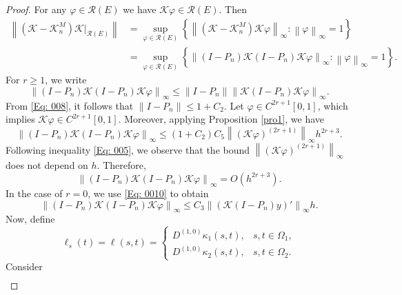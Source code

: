 \documentclass[10pt,a4paper]{amsart}
\newcommand{\norm}[1]{\left\lVert #1\right\rVert}
\begin{document}
\begin{proof}
	For any \(\varphi \in \mathcal{R}(E)\) we have  \( \mathcal{K}\varphi \in \mathcal{R}(E)\). Then 
	\begin{align*}
		\norm{(\mathcal{K} - \mathcal{K}_n^M) \mathcal{K} |_{\mathcal{R}(E)}} &= \sup_{\varphi \in \mathcal{R}(E)}\left\{ 	\norm{(\mathcal{K} - \mathcal{K}_n^M) \mathcal{K}\varphi}_\infty : \norm{\varphi}_\infty =1 \right\} \\
		&= \sup_{\varphi \in \mathcal{R}(E)}\left\{ \norm{(I - P_n) \mathcal{K}(I - P_n)\mathcal{K}\varphi}_\infty : \norm{\varphi}_\infty =1 \right\}.
	\end{align*}
	For \( r \geq 1 \), we write  
	\begin{equation*}
		\norm{(I - P_n) \mathcal{K}(I - P_n)\mathcal{K}\varphi}_\infty \leq\norm{I - P_n} \norm{\mathcal{K}(I - P_n)\mathcal{K}\varphi}_\infty.
	\end{equation*}
	From \eqref{Eq: 008}, it follows that \( \norm{I - P_n} \leq 1 +C_2 \). Let \( \varphi \in C^{2r+1}[0,1] \), which implies \( \mathcal{K} \varphi \in C^{2r+1}[0,1] \). Moreover, applying Proposition \ref{pro1}, we have
	\begin{equation*}
		\norm{(I - P_n) \mathcal{K}(I - P_n)\mathcal{K}\varphi}_\infty \leq (1 +C_2)C_5 \norm{(\mathcal{K}\varphi)^{(2r+1)}}_\infty h^{2r+3}.
	\end{equation*}
	Following inequality \eqref{Eq: 005}, we observe that the bound \(\norm{ \left(\mathcal{K}\varphi\right)^{(2r+1)}}_\infty \) does not depend on \(h\). Therefore, 
	\begin{equation} \label{Eq: 0030}
		\norm{(I - P_n) \mathcal{K}(I - P_n)\mathcal{K}\varphi}_\infty = O\left(h^{2r+3}\right).
	\end{equation}
	In the case of \(r=0\), we use \eqref{Eq: 0010} to obtain
	\begin{equation} \label{Eq: 0031}
		\norm{(I - P_n) \mathcal{K}(I - P_n)\mathcal{K}\varphi}_\infty \leq C_3 \norm{\left( \mathcal{K}(I - P_n)y\right)'}_\infty h.
	\end{equation}
	Now, define 
	\begin{equation*}
		\ell_s(t) = \ell(s,t) = \begin{cases}
			D^{(1,0)} \kappa_1(s, t) , & s,t \in \Omega_1, \\
			D^{(1,0)} \kappa_2(s, t) , & s,t \in \Omega_2.
		\end{cases}
	\end{equation*}
	Consider 
	\begin{align*} 

\end{align*}
\end{proof}
\end{document}
